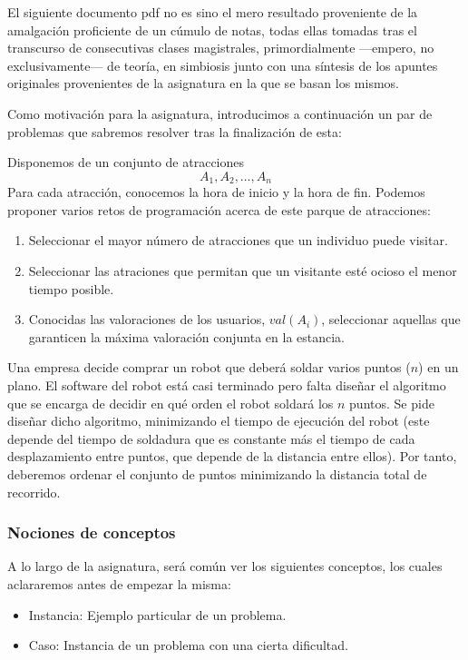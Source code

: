 El siguiente documento pdf no es sino el mero resultado proveniente de la amalgación proficiente de un cúmulo de notas, todas ellas tomadas tras el transcurso de consecutivas clases magistrales, primordialmente —empero, no exclusivamente— de teoría, en simbiosis junto con una síntesis de los apuntes originales provenientes de la asignatura en la que se basan los mismos.

Como motivación para la asignatura, introducimos a continuación un par de problemas que sabremos resolver tras la finalización de esta:

\begin{ejercicio*}
Disponemos de un conjunto de atracciones 
\[
A_1, A_2, \ldots, A_n
\]
Para cada atracción, conocemos la hora de inicio y la hora de fin. Podemos proponer varios retos de programación acerca de este parque de atracciones:
\begin{enumerate}
    \item Seleccionar el mayor número de atracciones que un individuo puede visitar.
    \item Seleccionar las atraciones que permitan que un visitante esté ocioso el menor tiempo posible.
    \item Conocidas las valoraciones de los usuarios, $val(A_i)$, seleccionar aquellas que garanticen la máxima valoración conjunta en la estancia.
\end{enumerate}
\end{ejercicio*}

\begin{ejercicio*}
Una empresa decide comprar un robot que deberá soldar varios puntos ($n$) en un plano. El software del robot está casi terminado pero falta diseñar el algoritmo que se encarga de decidir en qué orden el robot soldará los $n$ puntos. Se pide diseñar dicho algoritmo, minimizando el tiempo de ejecución del robot (este depende del tiempo de soldadura que es constante más el tiempo de cada desplazamiento entre puntos, que depende de la distancia entre ellos). Por tanto, deberemos ordenar el conjunto de puntos minimizando la distancia total de recorrido.
\end{ejercicio*}

\subsubsection{Nociones de conceptos}
A lo largo de la asignatura, será común ver los siguientes conceptos, los cuales aclararemos antes de empezar la misma:
\begin{itemize}
    \item Instancia: Ejemplo particular de un problema.
    \item Caso: Instancia de un problema con una cierta dificultad.
\end{itemize}

